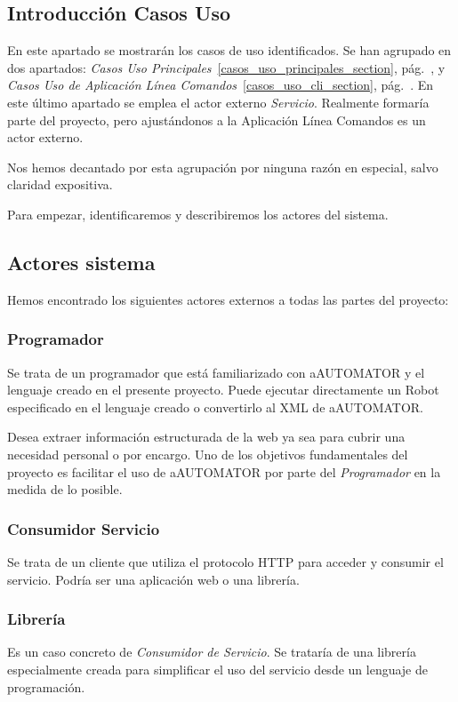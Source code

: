 \subsection{Introducción Casos Uso}

En este apartado se mostrarán los casos de uso identificados. Se han
agrupado en dos apartados: \emph{Casos Uso
  Principales}~\ref{casos_uso_principales_section},
pág.~\pageref{casos_uso_principales_section}, y \emph{Casos Uso de
  Aplicación Línea Comandos}~\ref{casos_uso_cli_section},
pág.~\pageref{casos_uso_cli_section}. En este último apartado se
emplea el actor externo \emph{Servicio}. Realmente formaría parte del
proyecto, pero ajustándonos a la Aplicación Línea Comandos es un actor
externo.

Nos hemos decantado por esta agrupación por ninguna razón en especial,
salvo claridad expositiva.

Para empezar, identificaremos y describiremos los actores del
sistema.

\subsection{Actores sistema}

Hemos encontrado los siguientes actores externos a todas las partes
del proyecto:

\subsubsection{Programador}
Se trata de un programador que está familiarizado con aAUTOMATOR y el
lenguaje creado en el presente proyecto. Puede ejecutar directamente
un Robot especificado en el lenguaje creado o convertirlo al XML de
aAUTOMATOR.

Desea extraer información estructurada de la web ya sea para cubrir
una necesidad personal o por encargo. Uno de los objetivos
fundamentales del proyecto es facilitar el uso de aAUTOMATOR por parte
del \emph{Programador} en la medida de lo posible.

\subsubsection{Consumidor Servicio}
Se trata de un cliente que utiliza el protocolo HTTP para acceder y
consumir el servicio. Podría ser una aplicación web o una librería.

\subsubsection{Librería}
Es un caso concreto de \emph{Consumidor de Servicio}. Se trataría de
una librería especialmente creada para simplificar el uso del servicio
desde un lenguaje de programación.

